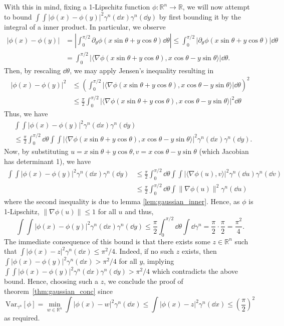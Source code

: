 With this in mind, fixing a 1-Lipschitz function \(\phi : \mathbb{R}^n \to \mathbb{R}\), we will now attempt 
to bound \(\int \int |\phi(x) - \phi(y)|^2 \gamma^n(\dd x) \gamma^n(\dd y)\) by first bounding it by 
the integral of a inner product. In particular, we observe
\begin{align*}
  |\phi(x) - \phi(y)| 
  & = \left|\int_0^{\pi / 2}\partial_\theta \phi(x \sin \theta + y \cos \theta) \dd \theta\right|
    \le \int_0^{\pi / 2}|\partial_\theta \phi(x \sin \theta + y \cos \theta)| \dd\theta\\
  & = \int_0^{\pi / 2} |\langle \nabla \phi(x \sin \theta + y \cos \theta), x \cos \theta - y \sin\theta\rangle| \dd \theta.
\end{align*}
Then, by rescaling \(\dd \theta\), we may apply Jensen's inequality resulting in
\begin{align*}
  |\phi(x) - \phi(y)|^2 
  & \le \left(\int_0^{\pi / 2} |\langle \nabla \phi(x \sin \theta + y \cos \theta), x \cos \theta - y \sin\theta\rangle| \dd \theta\right)^2\\
  & \le \frac{\pi}{2}\int_0^{\pi / 2} |\langle \nabla \phi(x \sin \theta + y \cos \theta), x \cos \theta - y \sin\theta\rangle|^2 \dd \theta
\end{align*}
Thus, we have 
\begin{align*}
  & \int \int |\phi(x) - \phi(y)|^2 \gamma^n(\dd x) \gamma^n(\dd y) \\
  & \le \frac{\pi}{2} \int_0^{\pi / 2} \dd \theta \int \int 
    |\langle \nabla \phi(x \sin \theta + y \cos \theta), x \cos \theta - y \sin\theta\rangle|^2
    \gamma^n(\dd x) \gamma^n(\dd y).
\end{align*}
Now, by substituting \(u = x \sin \theta + y\cos \theta, v = x \cos \theta - y \sin \theta\) (which Jacobian 
has determinant 1), we have
\begin{align*}
  \int \int |\phi(x) - \phi(y)|^2 \gamma^n(\dd x) \gamma^n(\dd y) 
  & \le \frac{\pi}{2} \int_0^{\pi / 2} \dd \theta \int \int |\langle \nabla \phi(u), v \rangle|^2 \gamma^n(\dd u) \gamma^n(\dd v)\\
  & \le \frac{\pi}{2}\int_0^{\pi / 2} \dd \theta \int \|\nabla \phi(u)\|^2 \gamma^n(\dd u)
\end{align*}
where the second inequality is due to lemma \ref{lem:gaussian_inner}. Hence, as \(\phi\) is 1-Lipschitz, 
\(\|\nabla \phi(u)\| \le 1\) for all \(u\) and thus, 
\[\int \int |\phi(x) - \phi(y)|^2 \gamma^n(\dd x) \gamma^n(\dd y) 
  \le \frac{\pi}{2}\int_0^{\pi / 2} \dd \theta \int \dd \gamma^n
  = \frac{\pi}{2} \cdot \frac{\pi}{2} = \frac{\pi^2}{4}.\]
The immediate consequence of this bound is that there exists some \(z \in \mathbb{R}^n\) such that 
\(\int |\phi(x) - z|^2 \gamma^n(\dd x) \le \pi^2 / 4\). Indeed, if no such \(z\) exists, 
then \(\int |\phi(x) - \phi(y)|^2 \gamma^n(\dd x) > \pi^2 / 4\) for all \(y\), implying
\(\int \int |\phi(x) - \phi(y)|^2 \gamma^n(\dd x) \gamma^n(\dd y) > \pi^2 / 4\) which 
contradicts the above bound. Hence, choosing such a \(z\), we conclude the proof of 
theorem~\ref{thm:gaussian_conc} since
\[\text{Var}_{\gamma^n}[\phi] = \min_{w \in \mathbb{R}^n} \int |\phi(x) - w|^2 \gamma^n(\dd x)
  \le \int |\phi(x) - z|^2 \gamma^n(\dd x) \le \left(\frac{\pi}{2}\right)^2\]
as required.

